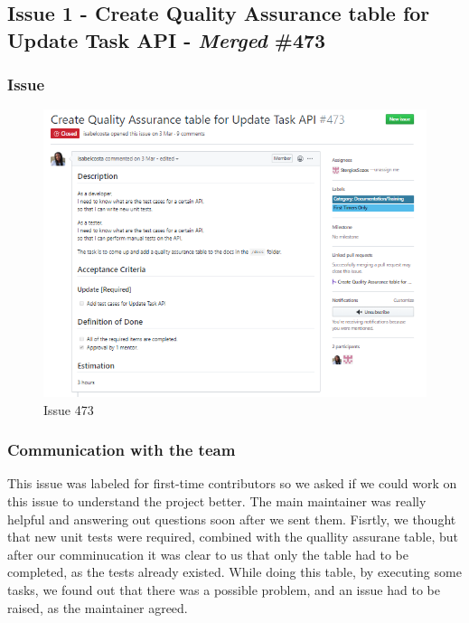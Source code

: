 \documentclass{article}
\begin{document}
\subsection{Issue 1 - Create Quality Assurance table for Update Task API - \emph{Merged} \#473}

\subsubsection{Issue}
\begin{figure}[tph!]
\centerline{\includegraphics[totalheight=13cm, width=15cm]{issue473.png}}
    \caption{Issue 473}
    \label{fig:verticalcell}
\end{figure}

\vfill
\clearpage

\subsubsection{Communication with the team}

\hspace{0.5cm}This issue was labeled for first-time contributors so we asked if we could work on this issue to understand the project better. The main maintainer was really helpful and answering out questions soon after we sent them.
Fisrtly, we thought that new unit tests were required, combined with the quallity assurane table, but after our comminucation it was clear to us that only the table had to be completed, as the tests already existed.
While doing this table, by executing some tasks, we found out that there was a possible problem, and an issue had to be raised, as the maintainer agreed.
\end{document}
